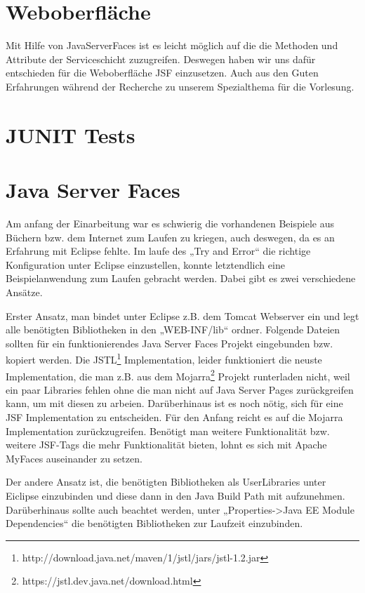 \documentclass[titlepage, 12pt,a4paper]{scrartcl}
\begin{document}
\section{Weboberfläche}
Mit Hilfe von JavaServerFaces ist es leicht möglich auf die die Methoden und
Attribute der Serviceschicht zuzugreifen. Deswegen haben wir uns dafür
entschieden für die Weboberfläche JSF einzusetzen. Auch aus den Guten
Erfahrungen während der Recherche zu unserem Spezialthema für die Vorlesung. 

\section{JUNIT Tests}

\section{Java Server Faces}
Am anfang der Einarbeitung war es schwierig die vorhandenen Beispiele aus
Büchern bzw. dem Internet zum Laufen zu kriegen, auch deswegen, da es an
Erfahrung mit Eclipse fehlte. Im laufe des „Try and Error“ die richtige
Konfiguration unter Eclipse einzustellen, konnte letztendlich eine
Beispielanwendung zum Laufen gebracht werden. Dabei gibt es zwei verschiedene
Ansätze. 

Erster Ansatz, man bindet unter Eclipse z.B. dem Tomcat Webserver ein und legt
alle benötigten Bibliotheken in den „WEB-INF/lib“ ordner. Folgende Dateien
sollten für ein funktionierendes Java Server Faces Projekt eingebunden
bzw. kopiert werden. Die
JSTL\footnote{http://download.java.net/maven/1/jstl/jars/jstl-1.2.jar}
Implementation, leider funktioniert die neuste Implementation, die man z.B. aus
dem Mojarra\footnote{https://jstl.dev.java.net/download.html} Projekt
runterladen nicht, weil ein paar Libraries fehlen ohne die man nicht auf Java
Server Pages zurückgreifen kann, um mit diesen zu arbeien. Darüberhinaus ist es
noch nötig, sich für eine JSF Implementation zu entscheiden. Für den Anfang
reicht es auf die Mojarra Implementation zurückzugreifen. Benötigt man weitere
Funktionalität bzw. weitere JSF-Tags die mehr Funktionalität bieten, lohnt es
sich mit Apache MyFaces auseinander zu setzen. 

Der andere Ansatz ist, die benötigten Bibliotheken als UserLibraries unter
Eiclipse einzubinden und diese dann in den Java Build Path mit aufzunehmen.
Darüberhinaus sollte auch beachtet werden, unter „Properties->Java EE
Module Dependencies“ die benötigten Bibliotheken zur Laufzeit einzubinden.
\end{document}

